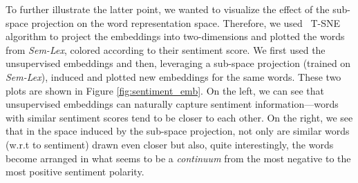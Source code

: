 \documentclass[letterpaper]{article}
\newcommand{\newcite}[1]{\citeauthor{#1} \shortcite{#1}}
\begin{document}
\begin{table}[!htb]
  \centering   
  \small
    \caption{Results for continuous lexicons in terms of Kendall $\tau$ rank correlation \label{tab:cont} }
\end{table}%

To further illustrate the latter point, we wanted to visualize the effect of the sub-space projection on the word representation space. Therefore, we used~\newcite{maaten2008visualizing} T-SNE algorithm to project the embeddings into two-dimensions and plotted the words from \textsl{Sem-Lex}, colored according to their sentiment score. We first used the unsupervised embeddings and then, leveraging a sub-space projection (trained on \textsl{Sem-Lex}), induced and plotted new embeddings for the same words. These two plots are shown in Figure \ref{fig:sentiment_emb}. On the left, we can see that unsupervised embeddings can naturally capture sentiment information---words with similar sentiment scores tend to be closer to each other. On the right, we see that in the space induced by the sub-space projection, not only are similar words (w.r.t to sentiment) drawn even closer but also, quite interestingly, the words become arranged in what seems to be a \textit{continuum} from the most negative to the most positive sentiment polarity.
\end{document}
